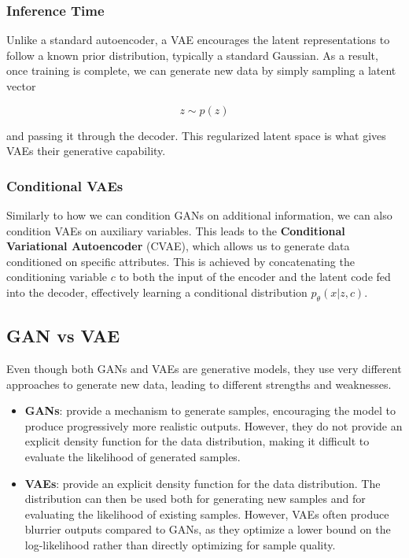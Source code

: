 \subsubsection{Inference Time}

Unlike a standard autoencoder, a VAE encourages the latent representations to follow a known prior distribution, typically a standard Gaussian. 
As a result, once training is complete, we can generate new data by simply sampling a latent vector

\[
z \sim p(z)
\]

and passing it through the decoder. This regularized latent space is what gives VAEs their generative capability.


\subsubsection{Conditional VAEs}
Similarly to how we can condition GANs on additional information, we can also condition VAEs on auxiliary variables. 
This leads to the \textbf{Conditional Variational Autoencoder} (CVAE), which allows us to generate data conditioned on specific attributes.
This is achieved by concatenating the conditioning variable $c$ to both the input of the encoder and the latent code fed into the decoder, effectively learning a conditional distribution $p_\theta(x|z,c)$.

\subsection{GAN vs VAE}
Even though both GANs and VAEs are generative models, they use very different approaches to generate new data, leading to different strengths and weaknesses.

\begin{itemize}
    \item \textbf{GANs}: provide a mechanism to generate samples, encouraging the model to produce progressively more realistic outputs. 
    However, they do not provide an explicit density function for the data distribution, making it difficult to evaluate the likelihood of generated samples.
    
    \item \textbf{VAEs}: provide an explicit density function for the data distribution. The distribution can then be used both for generating new samples and for evaluating the likelihood of existing samples. 
    However, VAEs often produce blurrier outputs compared to GANs, as they optimize a lower bound on the log-likelihood rather than directly optimizing for sample quality.
\end{itemize}

